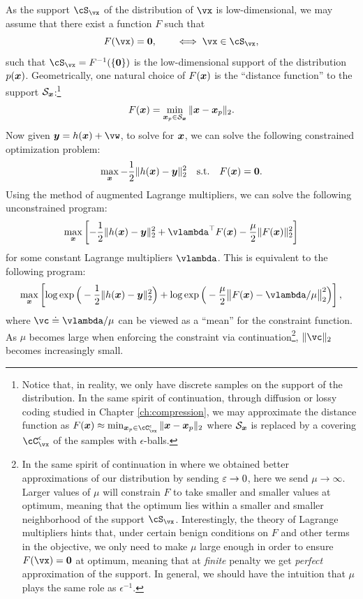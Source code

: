 \documentclass[../../book-main.tex]{subfiles}
\begin{document}
As the support \(\cS_{\vx}\) of the distribution of \(\vx\) is low-dimensional, we may assume that there exist a function \(F\) such that
\begin{equation}
  F(\vx) = \boldsymbol{0}, \qquad \iff \vx \in \cS_{\vx},
\end{equation}
such that \(\cS_{\vx} = F^{-1}(\{\vzero\})\) is the low-dimensional support of the distribution $p(\bm{x})$. Geometrically, one natural choice of $F(\bm{x})$ is the ``distance function'' to the support $\mathcal{S}_{\bm{x}}$:\footnote{Notice that, in reality, we only have discrete samples on the support of the distribution. In the same spirit of continuation, through diffusion or lossy coding studied in Chapter \ref{ch:compression},  we may approximate the distance function as $    F(\x) \approx \min_{\x_p \in \cC_{\vx}^{\epsilon}} \|\x - \x_p\|_2$ where $\mathcal{S}_{\bm{x}}$ is replaced by a covering \(\cC_{\vx}^{\epsilon}\) of the samples with $\epsilon$-balls. }
\begin{equation}
    F(\bm{x}) = \min_{\bm{x}_p \in \mathcal{S}_{\bm{x}}} \|\bm{x} - \bm{x}_p\|_2. 
\end{equation}
Now given $\y = h(\x) +\vw$, to solve for $\bm{x}$, we can solve the following constrained optimization problem:
\begin{equation}
    \max_{\bm{x}} - \frac{1}{2}\|h(\bm{x}) - \bm{y}\|_2^2 \quad \mbox{s.t.} \quad F(\bm{x}) = \boldsymbol{0}. 
\end{equation}
Using the method of augmented Lagrange multipliers, we can solve the following unconstrained program:
\begin{equation}
   \max_{\x} \left[-\frac{1}{2}\|h(\x) - \y\|_2^2  + \vlambda^{\top} F(\x) - \frac{\mu}{2} \|F(\x)\|_2^2\right]
\end{equation}
for some constant Lagrange multipliers $\vlambda$.
This is equivalent to the following program:
\begin{equation}\label{eq:lagrange_multiplier_continuation}
\max_{\x} \left[\log \exp\Big(- \frac{1}{2}\|h(\x) - \y\|_2^2\Big) + \log \exp\Big( - \frac{\mu}{2} \big\|F(\x) - \vlambda/\mu\big\|_2^2\Big)\right],
\end{equation} 
where $\vc \doteq {\vlambda}/{\mu}$ can be viewed as a ``mean''  for the constraint function. As $\mu$ becomes large when enforcing the constraint via continuation\footnote{In the same spirit of continuation in  where we obtained better approximations of our distribution by sending \(\varepsilon \to 0\), here we send \(\mu \to \infty\). Larger values of \(\mu\) will constrain \(F\) to take smaller and smaller values at optimum, meaning that the optimum lies within a smaller and smaller neighborhood of the support \(\cS_{\vx}\). Interestingly, the theory of Lagrange multipliers hints that, under certain benign conditions on \(F\) and other terms in the objective, we only need to make \(\mu\) large enough in order to ensure \(F(\vx) = \vzero\) at optimum, meaning that at \textit{finite} penalty we get \textit{perfect} approximation of the support. In general, we should have the intuition that \(\mu\) plays the same role as  \(\epsilon^{-1}\).}, $\|\vc\|_2$ becomes increasingly small.
\end{document}

